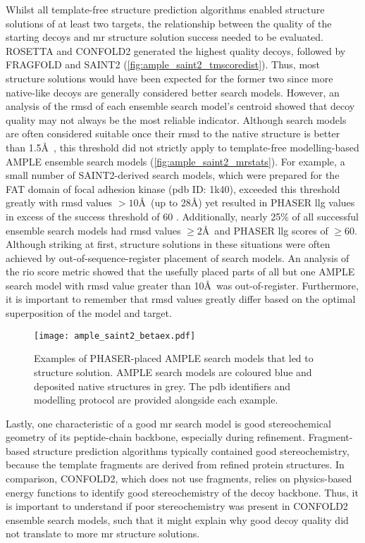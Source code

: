 Whilst all template-free structure prediction algorithms enabled structure solutions of at least two targets, the relationship between the quality of the starting decoys and \gls{mr} structure solution success needed to be evaluated. ROSETTA and CONFOLD2 generated the highest quality decoys, followed by FRAGFOLD and SAINT2 (\cref{fig:ample_saint2_tmscoredist}). Thus, most structure solutions would have been expected for the former two since more native-like decoys are generally considered better search models. However, an analysis of the \gls{rmsd} of each ensemble search model's centroid showed that decoy quality may not always be the most reliable indicator. Although search models are often considered suitable once their \gls{rmsd} to the native structure is better than 1.5\AA\ \cite{Scapin2013-yp}, this threshold did not strictly apply to template-free modelling-based AMPLE ensemble search models (\cref{fig:ample_saint2_mrstats}). For example, a small number of SAINT2-derived search models, which were prepared for the FAT domain of focal adhesion kinase (\gls{pdb} ID: 1k40), exceeded this threshold greatly with \gls{rmsd} values $>10$\AA\ (up to 28\AA) yet resulted in PHASER \gls{llg} values in excess of the success threshold of 60 \cite{Oeffner2018-ur}. Additionally, nearly 25\% of all successful ensemble search models had \gls{rmsd} values $\geq2$\AA\ and PHASER \gls{llg} scores of $\geq$60. Although striking at first, structure solutions in these situations were often achieved by out-of-sequence-register placement of search models. An analysis of the \gls{rio} score metric showed that the usefully placed parts of all but one AMPLE search model with \gls{rmsd} value greater than 10\AA\ was out-of-register. Furthermore, it is important to remember that \gls{rmsd} values greatly differ based on the optimal superposition of the model and target.

\begin{figure}[H]
    \centering
    \texttt{[image: ample\_saint2\_betaex.pdf]}
    \caption[Examples of PHASER-placed AMPLE search models]{Examples of PHASER-placed AMPLE search models that led to structure solution. AMPLE search models are coloured blue and deposited native structures in grey. The \gls{pdb} identifiers and modelling protocol are provided alongside each example.}
    \label{fig:ample_saint2_betaex}
\end{figure}

Lastly, one characteristic of a good \gls{mr} search model is good stereochemical geometry of its peptide-chain backbone, especially during refinement. Fragment-based structure prediction algorithms typically contained good stereochemistry, because the template fragments are derived from refined protein structures. In comparison, CONFOLD2, which does not use fragments, relies on physics-based energy functions to identify good stereochemistry of the decoy backbone. Thus, it is important to understand if poor stereochemistry was present in CONFOLD2 ensemble search models, such that it might explain why good decoy quality did not translate to more \gls{mr} structure solutions.

